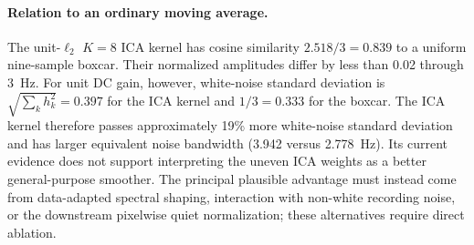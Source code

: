 \paragraph{Relation to an ordinary moving average.}
The unit-$\ell_2$ $K=8$ ICA kernel has cosine similarity $2.518/3=0.839$ to a uniform nine-sample boxcar. Their normalized amplitudes differ by less than 0.02 through \SI{3}{Hz}. For unit DC gain, however, white-noise standard deviation is $\sqrt{\sum_k h_k^2}=0.397$ for the ICA kernel and $1/3=0.333$ for the boxcar. The ICA kernel therefore passes approximately 19\% more white-noise standard deviation and has larger equivalent noise bandwidth (3.942 versus \SI{2.778}{Hz}). Its current evidence does not support interpreting the uneven ICA weights as a better general-purpose smoother. The principal plausible advantage must instead come from data-adapted spectral shaping, interaction with non-white recording noise, or the downstream pixelwise quiet normalization; these alternatives require direct ablation.
